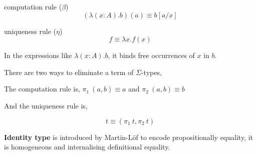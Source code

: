 \begin{multicols}{2}
\columnbreak
{}
\end{multicols}



\begin{multicols}{2}
computation rule ($\beta$)
$$(\lambda (x:A).b)(a) \equiv b[a/x]$$

\columnbreak

uniqueness rule ($\eta$)
$$f \equiv \lambda x. f(x) $$
\end{multicols}

In the expressions like $\lambda (x:A).b$, it binds free occurrences of $x$ in $b$.




\begin{multicols}{2}
\columnbreak
{}
\end{multicols}

There are two ways to eliminate a term of $\Sigma$-types,


\begin{multicols}{2}
\columnbreak
{}
\end{multicols}

The computation rule is, $\pi_1 ~(a,b) \equiv a$ and $\pi_2 ~(a,b) \equiv b$

And the uniqueness rule is,

$$t \equiv (\pi_1 ~t, \pi_2 ~t)$$

\textbf{Identity type} is introduced by Martin-L\"{o}f \cite{nor:90} to encode propositionally equality, it is homogeneous and internalising definitional equality.


\begin{multicols}{2}
\columnbreak
{}
\end{multicols}

